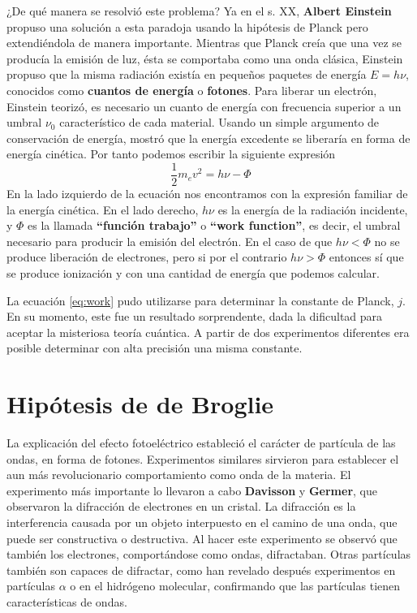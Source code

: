 ¿De qué manera se resolvió este problema? Ya en el s. XX, 
\textbf{Albert Einstein} propuso una solución a esta paradoja
usando la hipótesis de Planck pero extendiéndola de manera
importante.
Mientras que Planck creía que una vez se producía la emisión
de luz, ésta se comportaba como una onda clásica, Einstein
propuso que la misma radiación existía en pequeños
paquetes de energía $E=h\nu$, conocidos como 
\textbf{cuantos de energía} o \textbf{fotones}.
Para liberar un electrón, Einstein teorizó, es
necesario un cuanto de energía con frecuencia
superior a un umbral 
$\nu_0$ característico de cada material. 
Usando un simple argumento de conservación de energía,
mostró que la energía excedente se liberaría en forma de energía 
cinética. Por tanto
podemos escribir la siguiente expresión
\begin{equation}
\frac{1}{2}m_ev^2=h\nu - \Phi \label{eq:work}
\end{equation}
En la lado izquierdo de la ecuación nos encontramos con la 
expresión familiar de la energía cinética. En el lado
derecho, $h\nu$ es la energía de la radiación incidente, y 
$\Phi$ es la llamada \textbf{``función trabajo''} o 
\textbf{``work function''}, es decir, el umbral necesario para 
producir la emisión del electrón. En el caso de que
$h\nu<\Phi$ no se produce liberación de electrones, pero si
por el contrario $h\nu>\Phi$ entonces sí que se produce
ionización y con una cantidad de energía que podemos calcular.

La ecuación \ref{eq:work} pudo utilizarse para determinar 
la constante de Planck, $j$. En su momento, este fue un resultado
sorprendente, dada la dificultad para aceptar la misteriosa
teoría cuántica. A partir de dos experimentos diferentes
era posible determinar con alta precisión una misma constante.

\section{Hipótesis de de Broglie}
La explicación del efecto fotoeléctrico estableció el carácter de
partícula de las ondas, en forma de fotones. 
Experimentos similares sirvieron para 
establecer el aun más revolucionario comportamiento como onda 
de la materia. El experimento más importante lo llevaron a cabo 
\textbf{Davisson} y \textbf{Germer}, 
que observaron la difracción de electrones en un cristal. 
La difracción es la interferencia causada por un objeto 
interpuesto en el camino de una onda, que puede ser constructiva
o destructiva. Al hacer este experimento se observó que también 
los electrones, comportándose como ondas, difractaban.
Otras partículas también son capaces de difractar, como han 
revelado después experimentos en partículas $\alpha$ o en
el hidrógeno molecular, confirmando que las partículas tienen
características de ondas. 

